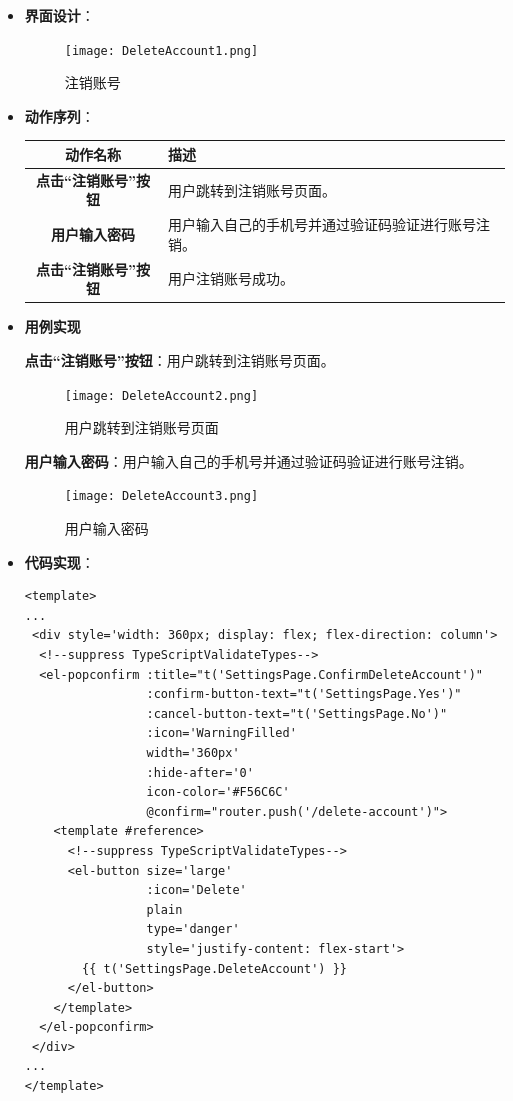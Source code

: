 \begin{itemize}
\item \textbf{界面设计}：
	\begin{figure}[H]
		\centering
		\texttt{[image: DeleteAccount1.png]}
		\caption{注销账号}
	\end{figure}
	\item \textbf{动作序列}：
	\begin{table}[H]
		\centering
		\renewcommand\arraystretch{1.5}
		\begin{tabular}{|c|>{\raggedright\arraybackslash}p{10cm}|}
			\hline
			\textbf{动作名称} & \textbf{描述} \\ \hline
			\textbf{点击“注销账号”按钮} & 用户跳转到注销账号页面。\\ \hline
			\textbf{用户输入密码} & 用户输入自己的手机号并通过验证码验证进行账号注销。\\ \hline
			\textbf{点击“注销账号”按钮} & 用户注销账号成功。\\ \hline
		\end{tabular}
	\end{table}

	\item \textbf{用例实现}

	\textbf{点击“注销账号”按钮}：用户跳转到注销账号页面。

	\begin{figure}[H]
		\centering
		\texttt{[image: DeleteAccount2.png]}
		\caption{用户跳转到注销账号页面}
	\end{figure}

	\textbf{用户输入密码}：用户输入自己的手机号并通过验证码验证进行账号注销。

	\begin{figure}[H]
		\centering
		\texttt{[image: DeleteAccount3.png]}
		\caption{用户输入密码}
	\end{figure}

	\item \textbf{代码实现}：
	\begin{verbatim}
<template>
...
 <div style='width: 360px; display: flex; flex-direction: column'>
  <!--suppress TypeScriptValidateTypes-->
  <el-popconfirm :title="t('SettingsPage.ConfirmDeleteAccount')"
                 :confirm-button-text="t('SettingsPage.Yes')"
                 :cancel-button-text="t('SettingsPage.No')"
                 :icon='WarningFilled'
                 width='360px'
                 :hide-after='0'
                 icon-color='#F56C6C'
                 @confirm="router.push('/delete-account')">
    <template #reference>
      <!--suppress TypeScriptValidateTypes-->
      <el-button size='large'
                 :icon='Delete'
                 plain
                 type='danger'
                 style='justify-content: flex-start'>
        {{ t('SettingsPage.DeleteAccount') }}
      </el-button>
    </template>
  </el-popconfirm>
 </div>
...
</template>
	\end{verbatim}
	

\end{itemize}
